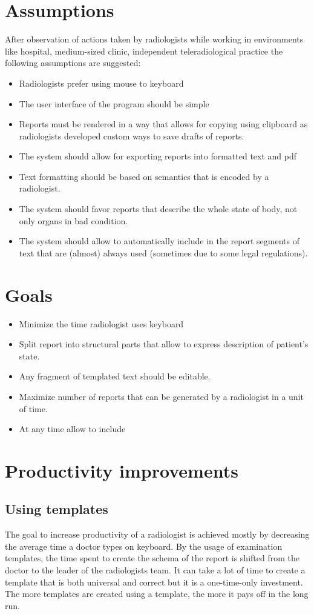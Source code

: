 \documentclass[12pt, twoside, openany]{report}
\theoremstyle{definition}
\begin{document}
\section{Assumptions}
After observation of actions taken by radiologists while working in environments like hospital, medium-sized clinic, independent teleradiological practice the following assumptions are suggested:
\begin{itemize}
    \item Radiologists prefer using mouse to keyboard
    \item The user interface of the program should be simple 
    \item Reports must be rendered in a way that allows for copying using clipboard as radiologists developed custom ways to save drafts of reports.
    \item The system should allow for exporting reports into formatted text and pdf
    \item Text formatting should be based on semantics that is encoded by a radiologist.
    \item The system should favor reports that describe the whole state of body, not only organs in bad condition.
    \item The system should allow to automatically include in the report segments of text that are (almost) always used (sometimes due to some legal regulations).

\end{itemize}
\section{Goals}
\begin{itemize}
\item Minimize the time radiologist uses keyboard
\item Split report into structural parts that allow to express description of patient's state.
\item Any fragment of templated text should be editable. 
\item Maximize number of reports that can be generated by a radiologist in a unit of time.
\item At any time allow to include
\end{itemize}


\section{Productivity improvements}
\subsection{Using templates}
The goal to increase productivity of a radiologist is achieved mostly by decreasing the average time a doctor types on keyboard. By the usage of examination templates, the time spent to create the schema of the report is shifted from the doctor to the leader of the radiologists team. It can take a lot of time to create a template that is both universal and correct but it is a one-time-only investment. The more templates are created using a template, the more it pays off in the long run.
\end{document}
